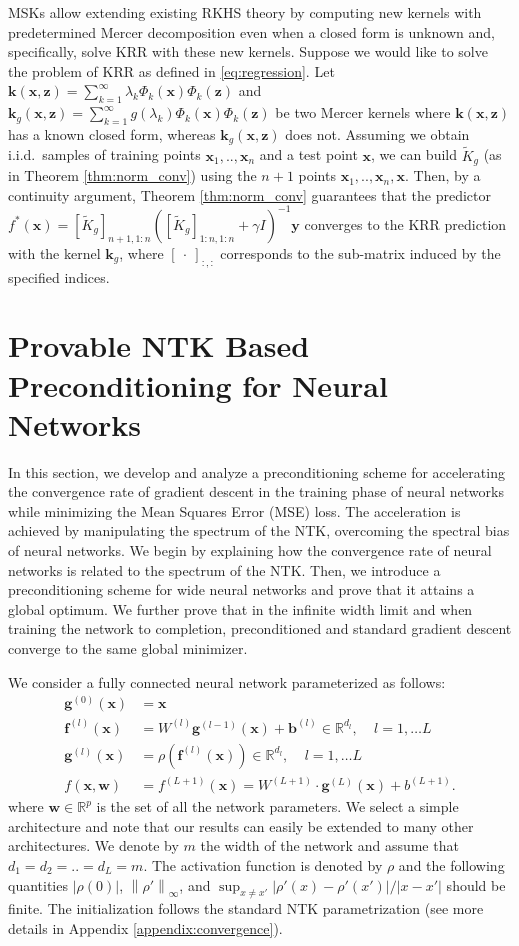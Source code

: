 \documentclass[10pt]{article} %
\theoremstyle{plain}
\theoremstyle{definition}
\theoremstyle{remark}
\newcommand{\Real}{\mathbb{R}}
\newcommand{\norm}[1]{\left\lVert#1\right\rVert}
\newcommand{\x}{\mathbf{x}}
\newcommand{\z}{\mathbf{z}}
\newcommand{\y}{\mathbf{y}}
\newcommand{\w}{\mathbf{w}}
\newcommand{\f}{\mathbf{f}}
\newcommand{\g}{\mathbf{g}}
\newcommand{\kr}{\boldsymbol{k}}
\begin{document}
MSKs allow extending existing RKHS theory by computing new kernels with predetermined Mercer decomposition even when a  closed form is unknown and, specifically, solve KRR with these new kernels. Suppose we would like to solve the problem of KRR as defined in \eqref{eq:regression}. Let $\kr(\x,\z)=\sum_{k=1}^\infty \lambda_k\Phi_k(\x)\Phi_k(\z)$ and $\kr_g(\x,\z)=\sum_{k=1}^\infty g(\lambda_k)\Phi_k(\x)\Phi_k(\z)$ be two Mercer kernels where $\kr(\x,\z)$ has a known closed form, whereas $\kr_g(\x,\z)$ does not. Assuming we obtain i.i.d.\ samples of training points $\x_1,..,\x_n$ and a test point $\x$, we can build $\tilde K_g$ (as in Theorem \ref{thm:norm_conv}) using the $n+1$ points $\x_1,..,\x_n,\x$. Then, by a continuity argument, Theorem  \ref{thm:norm_conv} guarantees that the predictor $f^*(\x)=[\tilde K_g]_{n+1,1:n}([\tilde K_g]_{1:n,1:n}+\gamma I)^{-1}\y$ converges to the KRR prediction with the kernel $\kr_g$, where $[~\cdot~]_{:,:}$ corresponds to the sub-matrix induced by the specified indices.



\section{Provable NTK Based Preconditioning for Neural Networks}\label{sec:pgd_intro}

In this section, we develop and analyze a preconditioning scheme for accelerating the convergence rate of gradient descent in the training phase of neural networks while minimizing the Mean Squares Error (MSE) loss. The acceleration is achieved by manipulating the spectrum of the NTK, overcoming the spectral bias of neural networks. We begin by explaining how the convergence rate of neural networks is related to the spectrum of the NTK. Then, we introduce a preconditioning scheme for wide neural networks and prove that it attains a global optimum. We further prove that in the infinite width limit and when training the network to completion, preconditioned and standard gradient descent converge to the same global minimizer.


We consider a fully connected neural network parameterized as follows:
\begin{align*}
    \g^{(0)}(\x) & = \x  \\
    \f^{(l)}(\x) & = W^{(l)}\g^{(l-1)} (\x) + \mathbf{b}^{(l)}  \in \Real^{d_l}, ~~~~~l=1,\ldots L \\
    \g^{(l)}(\x) & = 
    \rho\left(\f^{(l)}(\x)\right)\in \Real^{d_l}, ~~~~~l=1,\ldots L \\
    f(\x,\w) & = f^{(L+1)}(\x) = W^{(L+1)} \cdot \g^{(L)}(\x) + b^{(L+1)}.
\end{align*}
where $\w\in \Real^p$ is the set of all the network parameters. We select a simple architecture and note that our results can easily be extended to many other architectures. We denote by $m$ the width of the network and assume that $d_1=d_2=..=d_L=m$. The activation function is denoted by $\rho$ and the following quantities  $|\rho(0)|$, $\norm{\rho'}_\infty$, and $\sup_{x\neq x'}|\rho'(x)-\rho'(x')|/|x-x'|$ should be finite. The initialization follows the standard NTK parametrization \citep{lee2020finite} (see more details in Appendix \ref{appendix:convergence}).
\end{document}
